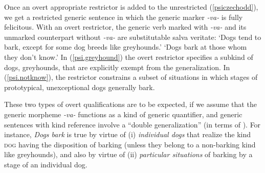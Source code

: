 \documentclass[output=paper,colorlinks,citecolor=brown]{langscibook}
\begin{document}
Once an overt appropriate restrictor
is added to the unrestricted (\ref{psiczechodd}), we get a restricted generic sentence in which the generic marker \textit{-va-} is fully felicitous.
With an overt restrictor, the generic verb marked with
\textit{-va-} and its unmarked counterpart without \textit{-va-} are  substitutable salva veritate:
\ea
{}
\glt `Dogs tend to bark, except for some dog breeds like greyhounds.'
\glt `Dogs bark at those whom they don't know.'
\z
\z
\noindent In (\ref{psi.greyhound}) the overt restrictor
specifies a subkind of dogs, greyhounds, that are explicitly
exempt from the generalization. In (\ref{psi.notknow}), the restrictor constrains a subset of situations in
which stages of prototypical, unexceptional dogs generally bark.

These two types of overt qualifications
are to be expected, if we assume that the
generic morpheme \textit{-va-} functions as a kind of
generic quantifier, and generic sentences with
kind reference involve a ``double generalization''
(in terms of \citealt{carlson2011}). For instance, \textit{Dogs bark} is true by virtue of (i) \textit{individual dogs} that realize the kind \textsc{dog}  having the disposition of barking (unless they belong to a non-barking kind like greyhounds), and also by virtue of (ii) \textit{particular situations} of barking by a stage of an individual dog.
\end{document}

